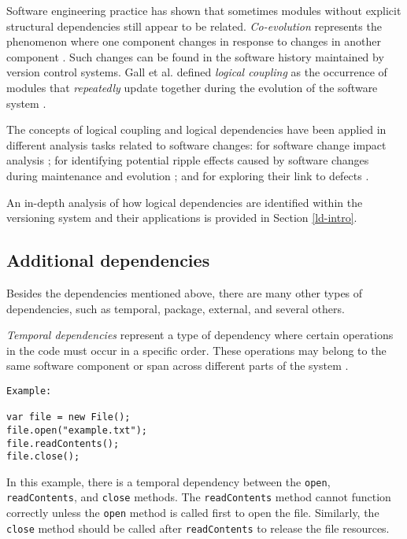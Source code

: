 Software engineering practice has shown that sometimes modules without explicit structural dependencies still appear to be related. \textit{Co-evolution} represents the phenomenon where one component changes in response to changes in another component \cite{Yu:2007:UCC:1231330.1231370, Cataldo2009SoftwareDW}. Such changes can be found in the software history maintained by version control systems. Gall et al. defined \textit{logical coupling} as the occurrence of modules that \emph{repeatedly} update together during the evolution of the software system \cite{Gall:1998:DLC:850947.853338, Gall:2003:CRH:942803.943741, 6606615}.

The concepts of logical coupling and logical dependencies have been applied in different analysis tasks related to software changes: for software change impact analysis \cite{1553643}; for identifying potential ripple effects caused by software changes during maintenance and evolution \cite{DBLP:conf/issre/OlivaG15, Oliva:2011:ISL:2067853.2068086, Poshyvanyk2009, posh2010}; and for exploring their link to defects \cite{wiese, Zimmermann:2004:MVH:998675.999460}.

An in-depth analysis of how logical dependencies are identified within the versioning system and their applications is provided in Section \ref{ld-intro}.


\subsection{Additional dependencies}

\hspace{4em} Besides the dependencies mentioned above, there are many other types of dependencies, such as temporal, package, external, and several others.

\textit{Temporal dependencies} represent a type of dependency where certain operations in the code must occur in a specific order. These operations may belong to the same software component or span across different parts of the system \cite{Cataldo2009SoftwareDW}.

\begin{verbatim}
Example:

var file = new File();
file.open("example.txt");
file.readContents();
file.close();
\end{verbatim}

In this example, there is a temporal dependency between the \texttt{open}, \texttt{readContents}, and \texttt{close} methods. The \texttt{readContents} method cannot function correctly unless the \texttt{open} method is called first to open the file. Similarly, the \texttt{close} method should be called after \texttt{readContents} to release the file resources.


